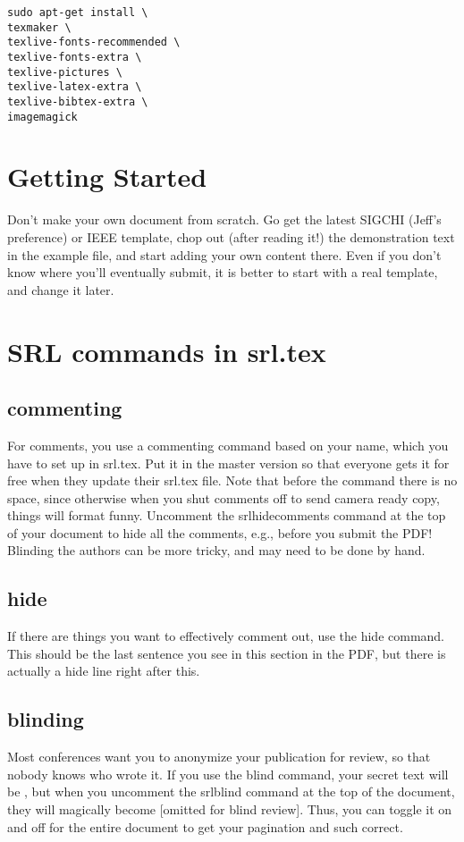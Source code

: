 \documentclass{sigchi}
\begin{document}
\begin{verbatim}
sudo apt-get install \
texmaker \
texlive-fonts-recommended \
texlive-fonts-extra \
texlive-pictures \
texlive-latex-extra \
texlive-bibtex-extra \
imagemagick
\end{verbatim}

\section{Getting Started}
Don't make your own document from scratch.
Go get the latest SIGCHI (Jeff's preference) or IEEE template, chop out (after reading it!) the demonstration text in the example file, and start adding your own content there.
Even if you don't know where you'll eventually submit, it is better to start with a real template, and change it later.

\section{SRL commands in srl.tex}

\subsection{commenting}
For comments, you use a commenting command based on your name, which you have to set up in srl.tex.
Put it in the master version so that everyone gets it for free when they update their srl.tex file.
Note that before the command there is no space, since otherwise when you shut comments off to send camera ready copy, things will format funny.
Uncomment the srlhidecomments command at the top of your document to hide all the comments, e.g., before you submit the PDF!
Blinding the authors can be more tricky, and may need to be done by hand.

\subsection{hide}
If there are things you want to effectively comment out, use the hide command.
This should be the last sentence you see in this section in the PDF, but there is actually a hide line right after this.
\hide{This does not appear in the compiled PDF!}

\subsection{blinding}
Most conferences want you to anonymize your publication for review, so that nobody knows who wrote it.
If you use the blind command, your secret text will be , but when you uncomment the srlblind command at the top of the document, they will magically become [omitted for blind review].
Thus, you can toggle it on and off for the entire document to get your pagination and such correct.
\end{document}
